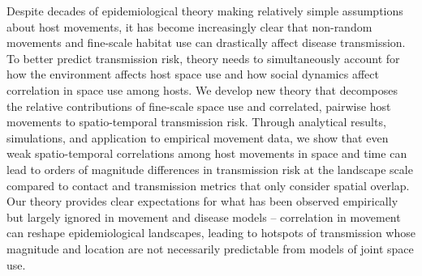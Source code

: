 \documentclass[letterpaper]{article}
\begin{document}
Despite decades of epidemiological theory making relatively simple assumptions about host movements, it has become increasingly clear that non-random movements and fine-scale habitat use can drastically affect disease transmission. To better predict transmission risk, theory needs to simultaneously account for how the environment affects host space use and how social dynamics affect correlation in space use among hosts. We develop new theory that decomposes the relative contributions of fine-scale space use and correlated, pairwise host movements to spatio-temporal transmission risk. Through analytical results, simulations, and application to empirical movement data, we show that even weak spatio-temporal correlations among host movements in space and time can lead to orders of magnitude differences in transmission risk at the landscape scale compared to contact and transmission metrics that only consider spatial overlap. Our theory provides clear expectations for what has been observed empirically but largely ignored in movement and disease models -- correlation in movement can reshape epidemiological landscapes, leading to hotspots of transmission whose magnitude and location are not necessarily predictable from models of joint space use.
\end{document}
